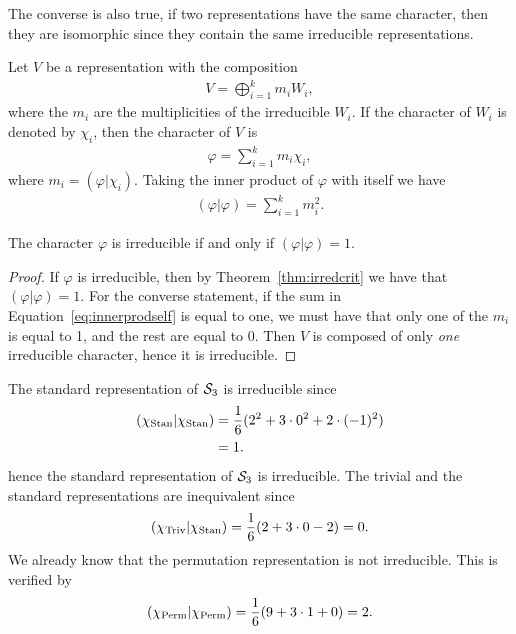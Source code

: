 \begin{remark}
	The converse is also true, if two representations have the same character, then they are isomorphic since they contain the same irreducible representations.
\end{remark}

\begin{note}
	Let $V$ be a representation with the composition 
	\begin{align*}
		V = \bigoplus_{i=1}^k m_i W_i, %
	\end{align*}
	where the $m_i$ are the multiplicities of the irreducible $W_i$. If the character of $W_i$ is denoted by $\chi_i$, then the character of $V$ is
	\begin{align*}
		\varphi = \sum_{i=1}^k m_i \chi_i,
	\end{align*}
	where $m_i = (\varphi|\chi_i)$.	Taking the inner product of $\varphi$ with itself we have
	\begin{align}\label{eq:innerprodself}
		(\varphi|\varphi) = \sum_{i=1}^k m_i^2.
	\end{align}
\end{note}

\begin{theorem}
	The character $\varphi$ is irreducible if and only if $(\varphi|\varphi) = 1$.
\end{theorem}
\begin{proof}
	If $\varphi$ is irreducible, then by Theorem~\ref{thm:irredcrit} we have that $(\varphi|\varphi) = 1$. For the converse statement, if the sum in Equation~\ref{eq:innerprodself} is equal to one, we must have that only one of the $m_i$ is equal to 1, and the rest are equal to 0. Then $V$ is composed of only \textit{one} irreducible character, hence it is irreducible.
\end{proof}

\begin{example}[$\Sym_3$]
	The standard representation of $\Sym_3$ is irreducible since
	\begin{align*}
		(\chi_{\text{Stan}}\vert\chi_{\text{Stan}})  &= \frac{1}{6}(2^2 + 3\cdot 0^2 + 2 \cdot (-1)^2)  \\
		&= 1.
	\end{align*}
	hence the standard representation of $\Sym_3$ is irreducible. The trivial and the standard representations are inequivalent since
	\begin{align*}
		(\chi_{\text{Triv}} | \chi_{\text{Stan}}) = \frac{1}{6}(2 + 3 \cdot 0 -2) = 0.
	\end{align*}
	We already know that the permutation representation is not irreducible.  This is verified by 
	\begin{align*}
		(\chi_{\text{Perm}} | \chi_{\text{Perm}}) = \frac{1}{6} ( 9 + 3 \cdot 1 + 0) = 2.
	\end{align*}
\end{example}

